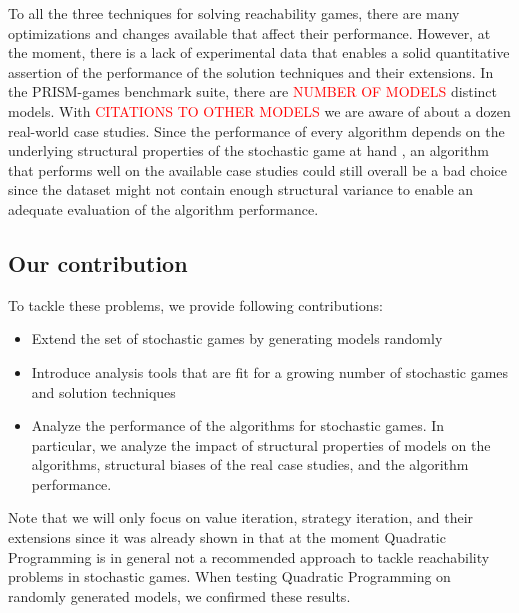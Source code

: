 To all the three techniques for solving reachability games, there are many optimizations and changes available that affect their performance.
However, at the moment, there is a lack of experimental data that enables a solid quantitative assertion of the performance of the solution techniques and their extensions.
In the PRISM-games benchmark suite, there are \textcolor{red}{NUMBER OF MODELS} distinct models. 
With \textcolor{red}{CITATIONS TO OTHER MODELS} we are aware of about a dozen real-world case studies.
Since the performance of every algorithm depends on the underlying structural properties of the stochastic game at hand \cite{gandalf}, 
an algorithm that performs well on the available case studies could still overall be a bad choice since the dataset might not contain enough
structural variance to enable an adequate evaluation of the algorithm performance.

\subsection*{Our contribution}
To tackle these problems, we provide following contributions:
\begin{itemize}
    \item Extend the set of stochastic games by generating models randomly
    \item Introduce analysis tools that are fit for a growing number of stochastic games and solution techniques
    \item Analyze the performance of the algorithms for stochastic games. 
        In particular, we analyze the impact of structural properties of models on the algorithms, structural biases of the real case studies, and the algorithm performance.
\end{itemize}

Note that we will only focus on value iteration, strategy iteration, and their extensions since it was already shown in \cite{gandalf} that at the moment
Quadratic Programming is in general not a recommended approach to tackle reachability problems in stochastic games.
When testing Quadratic Programming on randomly generated models, we confirmed these results.


